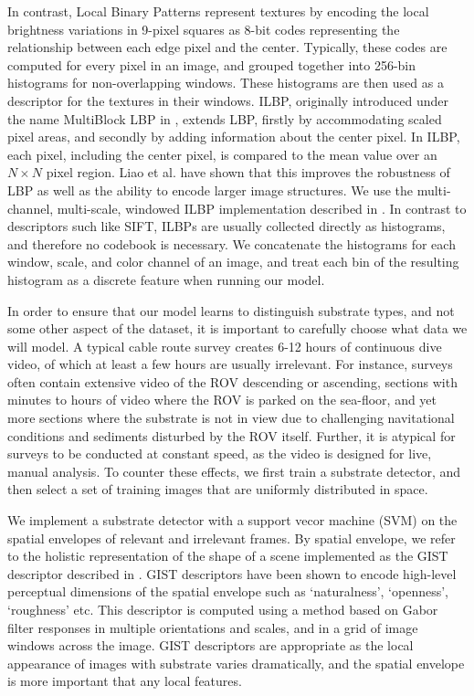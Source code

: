 In contrast, Local Binary Patterns represent textures by encoding the local brightness variations in 9-pixel squares as 8-bit codes representing the relationship between each edge pixel and the center. Typically, these codes are computed for every pixel in an image, and grouped together into 256-bin histograms for non-overlapping windows. These histograms are then used as a descriptor for the textures in their windows. ILBP, originally introduced under the name MultiBlock LBP in \citep{Liao2007}, extends LBP, firstly by accommodating scaled pixel areas, and secondly by adding information about the center pixel. In ILBP, each pixel, including the center pixel, is compared to the mean value over an $N \times N$ pixel region. Liao et al. have shown that this improves the robustness of LBP as well as the ability to encode larger image structures. We use the multi-channel, multi-scale, windowed ILBP implementation described in \citep{Paris2012}. In contrast to descriptors such like SIFT, ILBPs are usually collected directly as histograms, and therefore no codebook is necessary. We concatenate the histograms for each window, scale, and color channel of an image, and treat each bin of the resulting histogram as a discrete feature when running our model.

In order to ensure that our model learns to distinguish substrate types, and not some other aspect of the dataset, it is important to carefully choose what data we will model.
A typical cable route survey creates 6-12 hours of continuous dive video, of which at least a few hours are usually irrelevant. For instance, surveys often contain extensive video of the ROV descending or ascending, sections with minutes to hours of video where the ROV is parked on the sea-floor, and yet more sections where the substrate is not in view due to challenging navitational conditions and sediments disturbed by the ROV itself.
Further, it is atypical for surveys to be conducted at constant speed, as the video is designed for live, manual analysis. To counter these effects, we first train a substrate detector, and then select a set of training images that are uniformly distributed in space.

We implement a substrate detector with a support vecor machine (SVM) on the spatial envelopes of relevant and irrelevant frames.
By spatial envelope, we refer to the holistic representation of the shape of a scene implemented as the GIST
descriptor described in \citep{oliva2001GIST}. GIST descriptors have been shown to encode high-level perceptual dimensions of the
spatial envelope such as ‘naturalness’, ‘openness’, ‘roughness’ etc. This descriptor is computed using a method based on Gabor filter responses in multiple orientations and scales, and in a grid of image windows across the image. GIST descriptors are appropriate as the local appearance of images with substrate varies dramatically, and the spatial envelope is more important that any local features.


